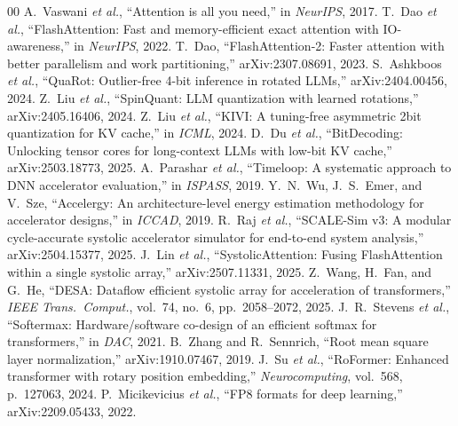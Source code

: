 \documentclass[conference]{IEEEtran}
\begin{document}
\begin{thebibliography}{00}
 A.~Vaswani \emph{et al.}, ``Attention is all you need,'' in \emph{NeurIPS}, 2017.
 T.~Dao \emph{et al.}, ``FlashAttention: Fast and memory-efficient exact attention with IO-awareness,'' in \emph{NeurIPS}, 2022.
 T.~Dao, ``FlashAttention-2: Faster attention with better parallelism and work partitioning,'' arXiv:2307.08691, 2023.
 S.~Ashkboos \emph{et al.}, ``QuaRot: Outlier-free 4-bit inference in rotated LLMs,'' arXiv:2404.00456, 2024.
 Z.~Liu \emph{et al.}, ``SpinQuant: LLM quantization with learned rotations,'' arXiv:2405.16406, 2024.
 Z.~Liu \emph{et al.}, ``KIVI: A tuning-free asymmetric 2bit quantization for KV cache,'' in \emph{ICML}, 2024.
 D.~Du \emph{et al.}, ``BitDecoding: Unlocking tensor cores for long-context LLMs with low-bit KV cache,'' arXiv:2503.18773, 2025.
 A.~Parashar \emph{et al.}, ``Timeloop: A systematic approach to DNN accelerator evaluation,'' in \emph{ISPASS}, 2019.
 Y.~N.~Wu, J.~S.~Emer, and V.~Sze, ``Accelergy: An architecture-level energy estimation methodology for accelerator designs,'' in \emph{ICCAD}, 2019.
 R.~Raj \emph{et al.}, ``SCALE-Sim v3: A modular cycle-accurate systolic accelerator simulator for end-to-end system analysis,'' arXiv:2504.15377, 2025.
 J.~Lin \emph{et al.}, ``SystolicAttention: Fusing FlashAttention within a single systolic array,'' arXiv:2507.11331, 2025.
 Z.~Wang, H.~Fan, and G.~He, ``DESA: Dataflow efficient systolic array for acceleration of transformers,'' \emph{IEEE Trans.\ Comput.}, vol.~74, no.~6, pp.~2058--2072, 2025.
 J.~R.~Stevens \emph{et al.}, ``Softermax: Hardware/software co-design of an efficient softmax for transformers,'' in \emph{DAC}, 2021.
 B.~Zhang and R.~Sennrich, ``Root mean square layer normalization,'' arXiv:1910.07467, 2019.
 J.~Su \emph{et al.}, ``RoFormer: Enhanced transformer with rotary position embedding,'' \emph{Neurocomputing}, vol.~568, p.~127063, 2024.
 P.~Micikevicius \emph{et al.}, ``FP8 formats for deep learning,'' arXiv:2209.05433, 2022.
\end{thebibliography}
\end{document}

